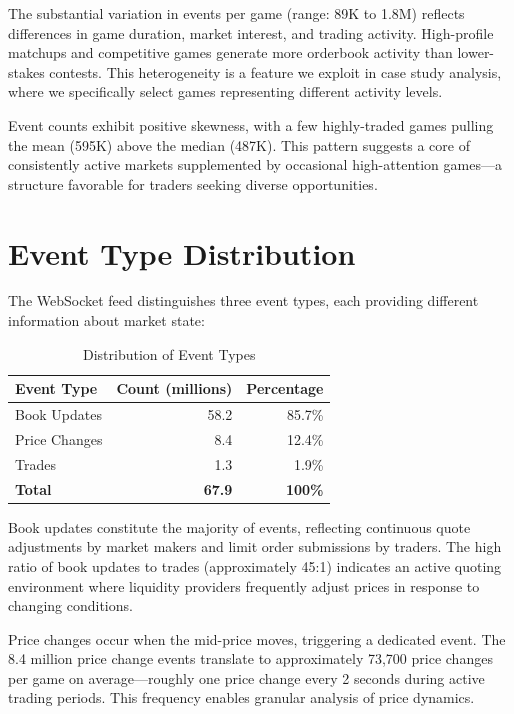 The substantial variation in events per game (range: 89K to 1.8M) reflects differences in game duration, market interest, and trading activity. High-profile matchups and competitive games generate more orderbook activity than lower-stakes contests. This heterogeneity is a feature we exploit in case study analysis, where we specifically select games representing different activity levels.

Event counts exhibit positive skewness, with a few highly-traded games pulling the mean (595K) above the median (487K). This pattern suggests a core of consistently active markets supplemented by occasional high-attention games---a structure favorable for traders seeking diverse opportunities.

\section{Event Type Distribution}

The WebSocket feed distinguishes three event types, each providing different information about market state:

\begin{table}[H]
\centering
\caption{Distribution of Event Types}
\label{tab:event-types}
\begin{tabular}{lrr}
\toprule
\textbf{Event Type} & \textbf{Count (millions)} & \textbf{Percentage} \\
\midrule
Book Updates & 58.2 & 85.7\% \\
Price Changes & 8.4 & 12.4\% \\
Trades & 1.3 & 1.9\% \\
\midrule
\textbf{Total} & \textbf{67.9} & \textbf{100\%} \\
\bottomrule
\end{tabular}
\end{table}

Book updates constitute the majority of events, reflecting continuous quote adjustments by market makers and limit order submissions by traders. The high ratio of book updates to trades (approximately 45:1) indicates an active quoting environment where liquidity providers frequently adjust prices in response to changing conditions.

Price changes occur when the mid-price moves, triggering a dedicated event. The 8.4 million price change events translate to approximately 73,700 price changes per game on average---roughly one price change every 2 seconds during active trading periods. This frequency enables granular analysis of price dynamics.

